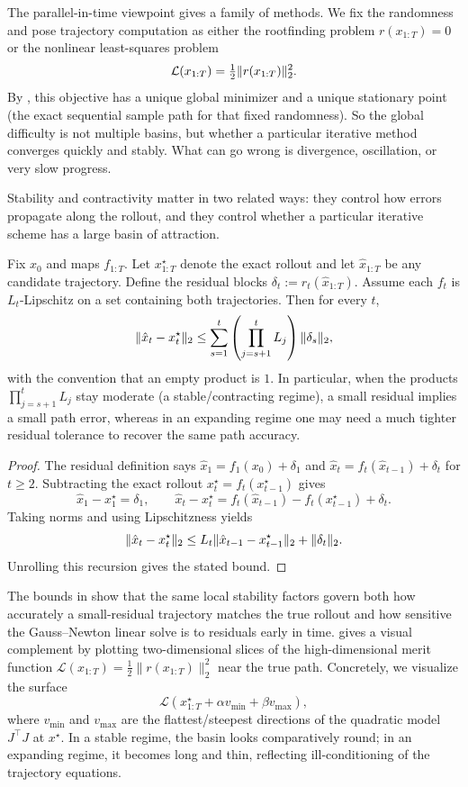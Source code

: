 \documentclass[11pt]{article}
\begin{document}
The parallel-in-time viewpoint gives a family of methods.
We fix the randomness and pose trajectory computation as either the rootfinding problem $r(x_{1:T})=0$ or the nonlinear least-squares problem
\[
  \mathcal{L}(x_{1:T})=\tfrac12\lVert r(x_{1:T})\rVert_2^2.
\]
By , this objective has a unique global minimizer and a unique stationary point (the exact sequential sample path for that fixed randomness).
So the global difficulty is not multiple basins, but whether a particular iterative method converges quickly and stably.
What can go wrong is divergence, oscillation, or very slow progress.

Stability and contractivity matter in two related ways: they control how errors propagate along the rollout, and they control whether a particular iterative scheme has a large basin of attraction.

\begin{proposition}
\label{prop:residual-to-path}
Fix $x_0$ and maps $f_{1:T}$.
Let $x^\star_{1:T}$ denote the exact rollout and let $\hat x_{1:T}$ be any candidate trajectory.
Define the residual blocks $\delta_t := r_t(\hat x_{1:T})$.
Assume each $f_t$ is $L_t$-Lipschitz on a set containing both trajectories.
Then for every $t$,
\[
\lVert\hat x_t-x_t^\star\rVert_2
\le \sum_{s=1}^t \left(\prod_{j=s+1}^t L_j\right)\lVert\delta_s\rVert_2,
\]
with the convention that an empty product is $1$.
In particular, when the products $\prod_{j=s+1}^t L_j$ stay moderate (a stable/contracting regime), a small residual implies a small path error, whereas in an expanding regime one may need a much tighter residual tolerance to recover the same path accuracy.%
\end{proposition}
\begin{proof}
The residual definition says $\hat x_1=f_1(x_0)+\delta_1$ and $\hat x_t=f_t(\hat x_{t-1})+\delta_t$ for $t\ge 2$.
Subtracting the exact rollout $x_t^\star=f_t(x_{t-1}^\star)$ gives
\[
\hat x_1-x_1^\star=\delta_1,\qquad
\hat x_t-x_t^\star = f_t(\hat x_{t-1})-f_t(x_{t-1}^\star)+\delta_t.
\]
Taking norms and using Lipschitzness yields
\[
\lVert\hat x_t-x_t^\star\rVert_2 \le L_t \lVert\hat x_{t-1}-x_{t-1}^\star\rVert_2 + \lVert\delta_t\rVert_2.
\]
Unrolling this recursion gives the stated bound.%
\end{proof}

The bounds in  show that the same local stability factors govern both how accurately a small-residual trajectory matches the true rollout and how sensitive the Gauss--Newton linear solve is to residuals early in time.
 gives a visual complement by plotting two-dimensional slices of the high-dimensional merit function $\mathcal{L}(x_{1:T})=\tfrac12\|r(x_{1:T})\|_2^2$ near the true path.
Concretely, we visualize the surface
\[
\mathcal{L}\!\left(x^\star_{1:T}+\alpha v_{\min}+\beta v_{\max}\right),
\]
where $v_{\min}$ and $v_{\max}$ are the flattest/steepest directions of the quadratic model $J^\top J$ at $x^\star$.
In a stable regime, the basin looks comparatively round; in an expanding regime, it becomes long and thin, reflecting ill-conditioning of the trajectory equations.
\end{document}
